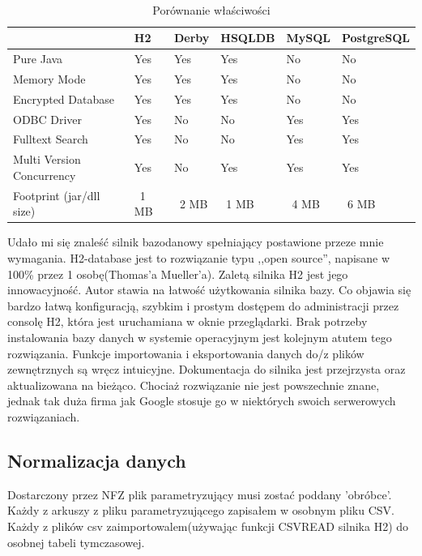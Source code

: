 \begin{table}[h]
 \caption{Porównanie właściwości}
 \tiny\tt
 \centering
 \vspace{0in}
 \begin{tabular}{|l|l|l|l|l|l|}
 \hline
  & \textbf{H2} & \textbf{Derby} & \textbf{HSQLDB} & \textbf{MySQL} & \textbf{PostgreSQL} \\
 \hline
 Pure Java & Yes & Yes & Yes & No & No \\
 \hline
 Memory Mode & Yes & Yes & Yes & No & No \\
 \hline
 Encrypted Database & Yes & Yes & Yes & No & No \\
 \hline
 ODBC Driver & Yes & No & No & Yes & Yes \\
 \hline
 Fulltext Search & Yes & No & No & Yes & Yes \\
 \hline
 Multi Version Concurrency & Yes & No & Yes & Yes & Yes \\
 \hline
 Footprint (jar/dll size) & ~1 MB & ~2 MB & ~1 MB & ~4 MB & ~6 MB \\
 \hline
 \end{tabular}
\end{table}

Udało mi się znaleść silnik bazodanowy spełniający postawione przeze mnie wymagania. H2-database jest to rozwiązanie typu ,,open source'', napisane w 100\% przez 1 osobę(Thomas'a Mueller'a). Zaletą silnika H2 jest jego innowacyjność. Autor stawia na łatwość użytkowania silnika bazy. Co objawia się bardzo łatwą konfiguracją, szybkim i prostym dostępem do administracji przez consolę H2, która jest uruchamiana w oknie przeglądarki. Brak potrzeby instalowania bazy danych w systemie operacyjnym jest kolejnym atutem tego rozwiązania. Funkcje importowania i eksportowania danych do/z plików zewnętrznych są wręcz intuicyjne. Dokumentacja do silnika jest przejrzysta oraz aktualizowana na bieżąco. Chociaż rozwiązanie nie jest powszechnie znane, jednak tak duża firma jak Google stosuje go w niektórych swoich serwerowych rozwiązaniach.

\subsection{Normalizacja danych}
\label{sec:normalizacjaDanych}

Dostarczony przez NFZ plik parametryzujący musi zostać poddany 'obróbce'. Każdy z arkuszy z pliku parametryzującego zapisałem w osobnym pliku CSV. Każdy z plików csv zaimportowalem(używając funkcji CSVREAD silnika H2) do osobnej tabeli tymczasowej.

